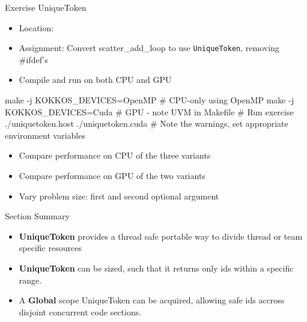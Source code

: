 \begin{frame}[fragile]{Exercise UniqueToken}

  \begin{small}
  \begin{itemize}
  \item Location: 
  \item Assignment: Convert scatter\_add\_loop to use \texttt{UniqueToken}, removing \#ifdef's
  \item Compile and run on both CPU and GPU
  \end{itemize}
  \end{small}

\begin{code}
make -j KOKKOS_DEVICES=OpenMP  # CPU-only using OpenMP
make -j KOKKOS_DEVICES=Cuda    # GPU - note UVM in Makefile 
# Run exercise
./uniquetoken.host
./uniquetoken.cuda
# Note the warnings, set appropriate environment variables
\end{code}

  \begin{scriptsize}
  \begin{itemize}
  \item Compare performance on CPU of the three variants
  \item Compare performance on GPU of the two variants
  \item Vary problem size: first and second optional argument
  \end{itemize}
  \end{scriptsize}

\end{frame}


\begin{frame}{Section Summary}

  \begin{itemize}
    \item{\textbf{UniqueToken} provides a thread safe portable way to divide thread or team specific resources}
    \item{\textbf{UniqueToken} can be sized, such that it returns only ids within a specific range.}
    \item{A \textbf{Global} scope UniqueToken can be acquired, allowing safe ids accross disjoint concurrent code sections.}
  \end{itemize}

\end{frame}

